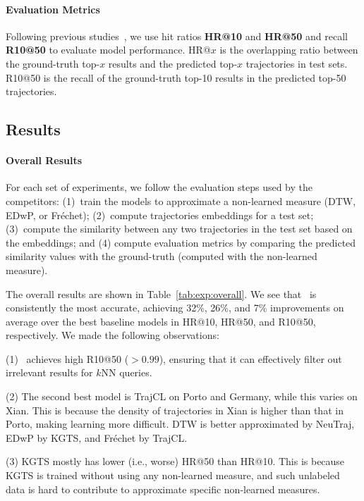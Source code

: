 \paragraph{Evaluation Metrics}
Following previous studies~\cite{neutraj,t3s,trajgat}, we use hit ratios \textbf{HR@10} and \textbf{HR@50} and  recall \textbf{R10@50} to evaluate model  performance.
HR@$x$ is the overlapping ratio between the ground-truth top-$x$ results and the predicted top-$x$ trajectories in test sets.
R10@50 is the recall of the ground-truth top-10 results in the predicted top-50 trajectories.




\subsection{Results}\label{subsec:exp:overall}

\paragraph{Overall Results} For each set of experiments, we follow the evaluation steps used by the competitors: (1)~train the models to approximate a non-learned measure (DTW, EDwP, or Fr\'echet); (2)~compute trajectories embeddings for a test set; (3)~compute the similarity between any two trajectories in the test set based on the embeddings; and (4) compute evaluation metrics by comparing the predicted similarity values
with the ground-truth (computed with the non-learned measure).


The overall results are shown in Table~\ref{tab:exp:overall}.
We see that \model\ is consistently the most accurate, achieving 32\%, 26\%, and 7\% improvements on average over the best baseline models in HR@10, HR@50, and R10@50, respectively. 
We made the following observations:

(1) \model\ achieves high R10@50 ($> 0.99$), ensuring that it can effectively filter out irrelevant results for $k$NN queries.


(2) The second best model is TrajCL on Porto and Germany, while this varies on Xian. This is because the density of trajectories in Xian is higher than that in Porto, making learning more difficult. DTW is better approximated by NeuTraj, EDwP by KGTS, and Fr\'echet by TrajCL.


(3) KGTS mostly has lower (i.e., worse) HR@50 than HR@10. This is because KGTS is trained without using any non-learned measure, and such unlabeled data is hard to contribute to approximate specific non-learned measures. 



